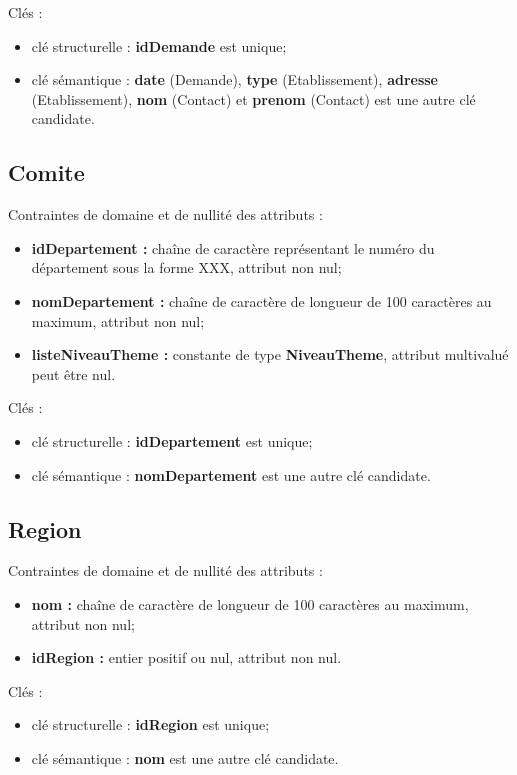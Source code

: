 \documentclass[asi, sansVersion]{picInsa}
\begin{document}
Clés : 
\begin{itemize}
\item clé structurelle : \textbf{idDemande} est unique;
\item clé sémantique : \textbf{date} (Demande), \textbf{type} (Etablissement), \textbf{adresse} (Etablissement), \textbf{nom} (Contact) et \textbf{prenom} (Contact) est une autre clé candidate. \\ 
\end{itemize}

\subsection*{Comite}
Contraintes de domaine et de nullité des attributs :
\begin{itemize}
	\item \textbf{idDepartement :} chaîne de caractère représentant le numéro du département sous la forme XXX, attribut non nul;
	\item \textbf{nomDepartement :} chaîne de caractère de longueur de 100 caractères au maximum, attribut non nul;
	\item \textbf{listeNiveauTheme :} constante de type \textbf{NiveauTheme}, attribut multivalué peut être nul. \\
\end{itemize}

Clés : 
\begin{itemize}
\item clé structurelle : \textbf{idDepartement} est unique;
\item clé sémantique : \textbf{nomDepartement} est une autre clé candidate. \\ 
\end{itemize}

\subsection*{Region}
Contraintes de domaine et de nullité des attributs :
\begin{itemize}
	\item \textbf{nom :} chaîne de caractère de longueur de 100 caractères au maximum, attribut non nul;
	\item \textbf{idRegion :} entier positif ou nul, attribut non nul. \\
\end{itemize}

Clés : 
\begin{itemize}
\item clé structurelle : \textbf{idRegion} est unique;
\item clé sémantique : \textbf{nom} est une autre clé candidate. \\ 
\end{itemize}
\end{document}
